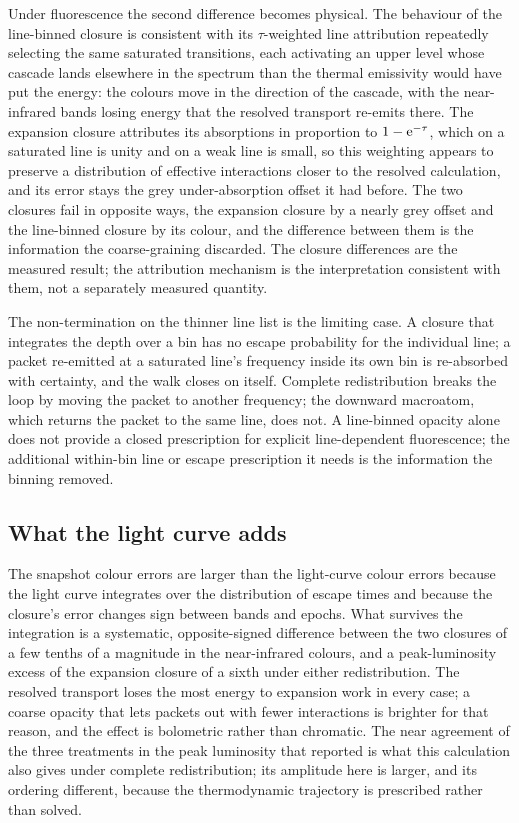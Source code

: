 \documentclass[fleqn,usenatbib]{mnras}
\begin{document}
Under fluorescence the second difference becomes physical. The behaviour of the line-binned closure is consistent with its $\tau$-weighted line attribution repeatedly selecting the same saturated transitions, each activating an upper level whose cascade lands elsewhere in the spectrum than the thermal emissivity would have put the energy: the colours move in the direction of the cascade, with the near-infrared bands losing energy that the resolved transport re-emits there. The expansion closure attributes its absorptions in proportion to $1-{\rm e}^{-\tau}$, which on a saturated line is unity and on a weak line is small, so this weighting appears to preserve a distribution of effective interactions closer to the resolved calculation, and its error stays the grey under-absorption offset it had before. The two closures fail in opposite ways, the expansion closure by a nearly grey offset and the line-binned closure by its colour, and the difference between them is the information the coarse-graining discarded. The closure differences are the measured result; the attribution mechanism is the interpretation consistent with them, not a separately measured quantity.

The non-termination on the thinner line list is the limiting case. A closure that integrates the depth over a bin has no escape probability for the individual line; a packet re-emitted at a saturated line's frequency inside its own bin is re-absorbed with certainty, and the walk closes on itself. Complete redistribution breaks the loop by moving the packet to another frequency; the downward macroatom, which returns the packet to the same line, does not. A line-binned opacity alone does not provide a closed prescription for explicit line-dependent fluorescence; the additional within-bin line or escape prescription it needs is the information the binning removed.

\subsection{What the light curve adds}

The snapshot colour errors are larger than the light-curve colour errors because the light curve integrates over the distribution of escape times and because the closure's error changes sign between bands and epochs. What survives the integration is a systematic, opposite-signed difference between the two closures of a few tenths of a magnitude in the near-infrared colours, and a peak-luminosity excess of the expansion closure of a sixth under either redistribution. The resolved transport loses the most energy to expansion work in every case; a coarse opacity that lets packets out with fewer interactions is brighter for that reason, and the effect is bolometric rather than chromatic. The near agreement of the three treatments in the peak luminosity that \citet{fontes2020} reported is what this calculation also gives under complete redistribution; its amplitude here is larger, and its ordering different, because the thermodynamic trajectory is prescribed rather than solved.
\end{document}
